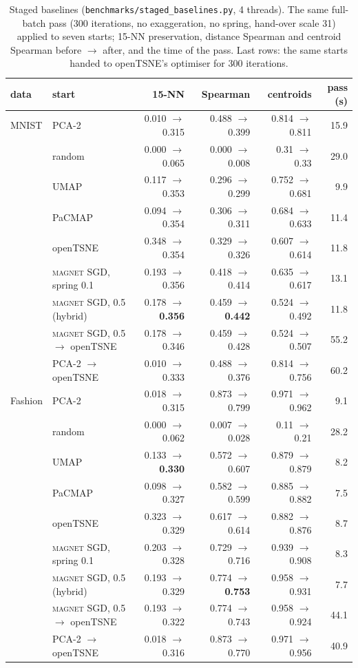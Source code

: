 \documentclass[11pt]{article}
\newcommand{\magnet}{\textsc{magnet}}
\begin{document}
\begin{table}[t]
\centering\small
\caption{Staged baselines (\texttt{benchmarks/staged\_baselines.py}, 4 threads). The same full-batch
pass (300 iterations, no exaggeration, no spring, hand-over scale 31) applied to seven starts; 15-NN
preservation, distance Spearman and centroid Spearman before $\to$ after, and the time of the pass. Last
rows: the same starts handed to openTSNE's optimiser for 300 iterations.}
\label{tab:staged}
\footnotesize
\begin{tabular}{llrrrr}
\toprule
data & start & 15-NN & Spearman & centroids & pass (s) \\
\midrule
MNIST & PCA-2 & 0.010 $\to$ 0.315 & 0.488 $\to$ 0.399 & 0.814 $\to$ 0.811 & 15.9 \\
 & random & 0.000 $\to$ 0.065 & 0.000 $\to$ 0.008 & 0.31 $\to$ 0.33 & 29.0 \\
 & UMAP & 0.117 $\to$ 0.353 & 0.296 $\to$ 0.299 & 0.752 $\to$ 0.681 & 9.9 \\
 & PaCMAP & 0.094 $\to$ 0.354 & 0.306 $\to$ 0.311 & 0.684 $\to$ 0.633 & 11.4 \\
 & openTSNE & 0.348 $\to$ 0.354 & 0.329 $\to$ 0.326 & 0.607 $\to$ 0.614 & 11.8 \\
 & \magnet{} SGD, spring 0.1 & 0.193 $\to$ 0.356 & 0.418 $\to$ 0.414 & 0.635 $\to$ 0.617 & 13.1 \\
 & \magnet{} SGD, 0.5 (hybrid) & 0.178 $\to$ \textbf{0.356} & 0.459 $\to$ \textbf{0.442} & 0.524 $\to$ 0.492 & 11.8 \\
 & \magnet{} SGD, 0.5 $\to$ openTSNE & 0.178 $\to$ 0.346 & 0.459 $\to$ 0.428 & 0.524 $\to$ 0.507 & 55.2 \\
 & PCA-2 $\to$ openTSNE & 0.010 $\to$ 0.333 & 0.488 $\to$ 0.376 & 0.814 $\to$ 0.756 & 60.2 \\
\midrule
Fashion & PCA-2 & 0.018 $\to$ 0.315 & 0.873 $\to$ 0.799 & 0.971 $\to$ 0.962 & 9.1 \\
 & random & 0.000 $\to$ 0.062 & 0.007 $\to$ 0.028 & 0.11 $\to$ 0.21 & 28.2 \\
 & UMAP & 0.133 $\to$ \textbf{0.330} & 0.572 $\to$ 0.607 & 0.879 $\to$ 0.879 & 8.2 \\
 & PaCMAP & 0.098 $\to$ 0.327 & 0.582 $\to$ 0.599 & 0.885 $\to$ 0.882 & 7.5 \\
 & openTSNE & 0.323 $\to$ 0.329 & 0.617 $\to$ 0.614 & 0.882 $\to$ 0.876 & 8.7 \\
 & \magnet{} SGD, spring 0.1 & 0.203 $\to$ 0.328 & 0.729 $\to$ 0.716 & 0.939 $\to$ 0.908 & 8.3 \\
 & \magnet{} SGD, 0.5 (hybrid) & 0.193 $\to$ 0.329 & 0.774 $\to$ \textbf{0.753} & 0.958 $\to$ 0.931 & 7.7 \\
 & \magnet{} SGD, 0.5 $\to$ openTSNE & 0.193 $\to$ 0.322 & 0.774 $\to$ 0.743 & 0.958 $\to$ 0.924 & 44.1 \\
 & PCA-2 $\to$ openTSNE & 0.018 $\to$ 0.316 & 0.873 $\to$ 0.770 & 0.971 $\to$ 0.956 & 40.9 \\
\bottomrule
\end{tabular}
\end{table}
\end{document}
